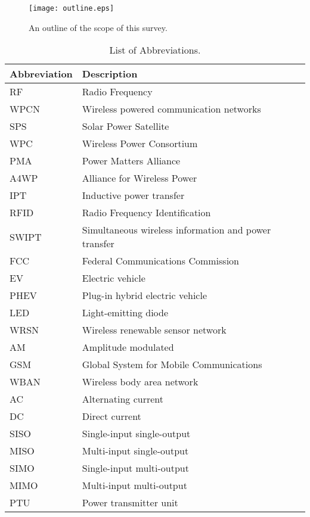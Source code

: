 \documentclass[twocolumn,10pt]{IEEEtran}
\begin{document}
\begin{figure} 
\centering
\texttt{[image: outline.eps]}
\caption{An outline of the scope of this survey.} \label{outline}
\end{figure}

\begin{table}
\footnotesize
\centering
\caption{\footnotesize  List of Abbreviations.} \label{Abbreviations}
\begin{tabular}{|l|l|} 
\hline
\footnotesize  {\bf Abbreviation} & {\bf Description} \\
\hline
RF & Radio Frequency \\
\hline
WPCN & Wireless powered communication networks \\
\hline
SPS & Solar Power Satellite\\
\hline
WPC & Wireless Power Consortium \\
\hline
PMA & Power Matters Alliance \\
\hline
A4WP & Alliance for Wireless Power \\
\hline
IPT & Inductive power transfer \\
\hline
RFID & Radio Frequency Identification \\
\hline
SWIPT & Simultaneous wireless information and power transfer  \\
\hline
FCC & Federal Communications Commission \\
\hline
EV & Electric vehicle \\
\hline
PHEV & Plug-in hybrid electric vehicle \\
\hline
LED & Light-emitting diode  \\
\hline
WRSN & Wireless renewable sensor network\\
\hline
AM & Amplitude modulated \\
\hline
GSM & Global System for Mobile Communications \\
\hline
WBAN & Wireless body area network \\
\hline
AC & Alternating current \\
\hline
DC & Direct current \\
\hline
SISO & Single-input single-output \\
\hline
MISO & Multi-input single-output \\
\hline
SIMO & Single-input multi-output \\
\hline
MIMO &  Multi-input multi-output  \\
\hline
PTU & Power transmitter unit \\

\end{tabular}
\end{table}
\end{document}
